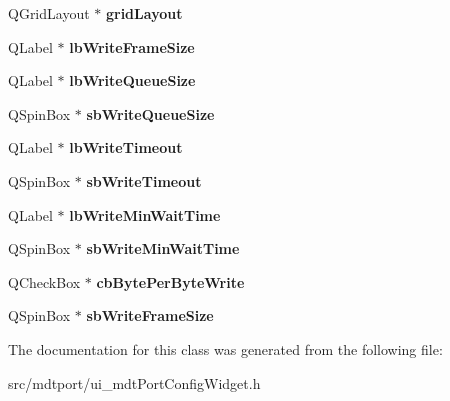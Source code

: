 \begin{DoxyCompactItemize}
\item 
\hypertarget{class_ui__mdt_port_config_widget_aa21a859343b5127133a6fa15f52bf74f}{
QGridLayout $\ast$ {\bfseries gridLayout}}
\label{class_ui__mdt_port_config_widget_aa21a859343b5127133a6fa15f52bf74f}

\item 
\hypertarget{class_ui__mdt_port_config_widget_a1d6c9086b1b1546c87df1fbaa3d68470}{
QLabel $\ast$ {\bfseries lbWriteFrameSize}}
\label{class_ui__mdt_port_config_widget_a1d6c9086b1b1546c87df1fbaa3d68470}

\item 
\hypertarget{class_ui__mdt_port_config_widget_a7f57346f1e11a863d0b77664edf6a671}{
QLabel $\ast$ {\bfseries lbWriteQueueSize}}
\label{class_ui__mdt_port_config_widget_a7f57346f1e11a863d0b77664edf6a671}

\item 
\hypertarget{class_ui__mdt_port_config_widget_ab5ded09564d59f57338a99642c8ad739}{
QSpinBox $\ast$ {\bfseries sbWriteQueueSize}}
\label{class_ui__mdt_port_config_widget_ab5ded09564d59f57338a99642c8ad739}

\item 
\hypertarget{class_ui__mdt_port_config_widget_aa0a486c1023d9f7d4e133ae86a826cc7}{
QLabel $\ast$ {\bfseries lbWriteTimeout}}
\label{class_ui__mdt_port_config_widget_aa0a486c1023d9f7d4e133ae86a826cc7}

\item 
\hypertarget{class_ui__mdt_port_config_widget_a146b41c99efbf3042b3eda59b18d3fe8}{
QSpinBox $\ast$ {\bfseries sbWriteTimeout}}
\label{class_ui__mdt_port_config_widget_a146b41c99efbf3042b3eda59b18d3fe8}

\item 
\hypertarget{class_ui__mdt_port_config_widget_a0a810127fbdacd283615f23c7e7066f1}{
QLabel $\ast$ {\bfseries lbWriteMinWaitTime}}
\label{class_ui__mdt_port_config_widget_a0a810127fbdacd283615f23c7e7066f1}

\item 
\hypertarget{class_ui__mdt_port_config_widget_a4740ead5e15cd5a13200123494aabdd4}{
QSpinBox $\ast$ {\bfseries sbWriteMinWaitTime}}
\label{class_ui__mdt_port_config_widget_a4740ead5e15cd5a13200123494aabdd4}

\item 
\hypertarget{class_ui__mdt_port_config_widget_a7365d7de9acfd1541849b65ffa1d9cae}{
QCheckBox $\ast$ {\bfseries cbBytePerByteWrite}}
\label{class_ui__mdt_port_config_widget_a7365d7de9acfd1541849b65ffa1d9cae}

\item 
\hypertarget{class_ui__mdt_port_config_widget_a52ec537c07730bc8bb402789ccb51774}{
QSpinBox $\ast$ {\bfseries sbWriteFrameSize}}
\label{class_ui__mdt_port_config_widget_a52ec537c07730bc8bb402789ccb51774}

\end{DoxyCompactItemize}


The documentation for this class was generated from the following file:\begin{DoxyCompactItemize}
\item 
src/mdtport/ui\_\-mdtPortConfigWidget.h\end{DoxyCompactItemize}
